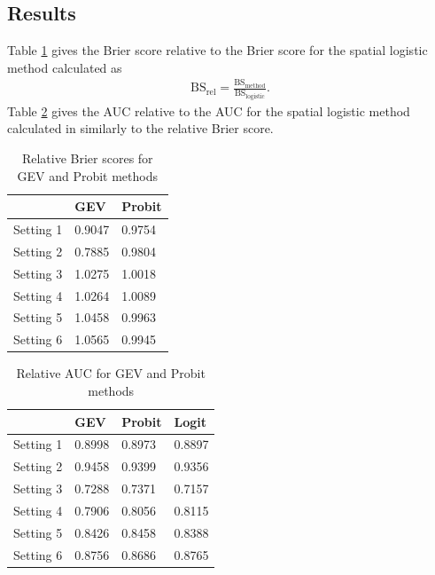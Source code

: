 \subsection{Results}
Table \ref{tbl:simbsresults} gives the Brier score relative to the Brier score for the spatial logistic method calculated as
\begin{align}
  \text{BS}_{\text{rel}} = \frac{\text{BS}_{\text{method}}}{\text{BS}_{\text{logistic}}}.
\end{align}
Table \ref{tbl:simaucresults} gives the AUC relative to the AUC for the spatial logistic method calculated in similarly to the relative Brier score.

\begin{table}
  \caption{Relative Brier scores for GEV and Probit methods}
  \label{tbl:simbsresults}
  \centering
  \begin{tabular}{r|ll}
    \cline{2-3}
              & GEV    & Probit\\
    \hline
    Setting 1 & 0.9047 & 0.9754\\
    Setting 2 & 0.7885 & 0.9804\\
    Setting 3 & 1.0275 & 1.0018\\
    Setting 4 & 1.0264 & 1.0089\\
    Setting 5 & 1.0458 & 0.9963\\
    Setting 6 & 1.0565 & 0.9945\\
    \hline
  \end{tabular}
\end{table}

\begin{table}
  \caption{Relative AUC for GEV and Probit methods}
  \label{tbl:simaucresults}
  \centering
  \begin{tabular}{r|lll}
    \cline{2-4}
              & GEV    & Probit & Logit\\
    \hline
    Setting 1 & 0.8998 & 0.8973 & 0.8897\\
    Setting 2 & 0.9458 & 0.9399 & 0.9356\\
    Setting 3 & 0.7288 & 0.7371 & 0.7157\\
    Setting 4 & 0.7906 & 0.8056 & 0.8115\\
    Setting 5 & 0.8426 & 0.8458 & 0.8388\\
    Setting 6 & 0.8756 & 0.8686 & 0.8765\\
    \hline
  \end{tabular}
\end{table}


